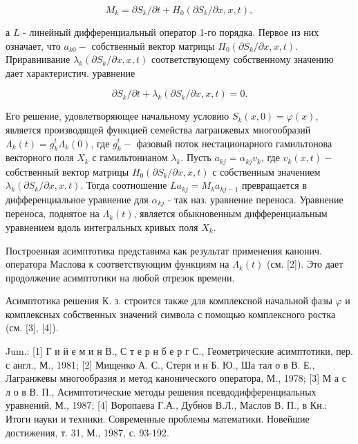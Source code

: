 \documentclass[10pt]{article}
\begin{document}
\[

M_{k}=\partial S_{k} / \partial t+H_{0}\left(\partial S_{k} / \partial x, x, t\right),

\]



а $L$ - линейный дифференциальный оператор 1-го порядка. Первое из них означает, что $a_{k 0}-$ собственный вектор матрицы $H_{0}\left(\partial S_{k} / \partial x, x, t\right)$. Приравнивание $\lambda_{k}\left(\partial S_{k} / \partial x, x, t\right)$ соответствующему собственному значению дает характеристич. уравнение



\[

\partial S_{k} / \partial t+\lambda_{k}\left(\partial S_{k} / \partial x, x, t\right)=0 .

\]



Его решение, удовлетворяющее начальному условию $S_{k}(x, 0)=\varphi(x)$, является производящей функцией семейства лагранжевых многообразий $\Lambda_{k}(t)=g_{k}^{t} \Lambda_{k}(0)$, где $g_{k}^{t}-$ фазовый поток нестационарного гамильтонова векторного поля $X_{k}$ с гамильтонианом $\lambda_{k}$. Пусть $a_{k j}=\alpha_{k j} v_{k}$, где $v_{k}(x, t)-$ собственный вектор матрицы $H_{0}\left(\partial S_{k} / \partial x, x, t\right)$ с собственным значением $\lambda_{k}\left(\partial S_{k} / \partial x, x, t\right)$. Тогда соотношение $L a_{k j}=M_{k} a_{k j-1}$ превращается в дифференциальное уравнение для $\alpha_{k j}$ - так наз. уравнение переноса. Уравнение переноса, поднятое на $\Lambda_{k}(t)$, является обыкновенным дифференциальным уравнением вдоль интегральных кривых поля $X_{k}$.



Построенная асимптотика представима как результат применения канонич. оператора Маслова к соответствующим функциям на $\Lambda_{k}(t)$ (см. [2]). Это дает продолжение асимптотики на любой отрезок времени.



Асимптотика решения К. з. строится также для комплексной начальной фазы $\varphi$ и комплексных собственных значений символа с помощью комплексного ростка (см. [3], [4]).



Jum.: [1] Г и й е м и н В., С т е р н б е р г С., Геометрические асимптотики, пер. с англ., М., 1981; [2] Мищенко А. С., Стерн и н Б. Ю., Ша тал о в В. Е., Лагранжевы многообразия и метод канонического оператора, М., 1978; [3] М а с л о в В. П., Асимптотические методы решения псевдодифференциальных уравнений, М., 1987; [4] Воропаева Г.А., Дубнов В.Л., Маслов В. П., в Кн.: Итоги науки и техники. Современные проблемы математики. Новейшие достижения, т. 31, М., 1987, с. 93-192.
\end{document}
